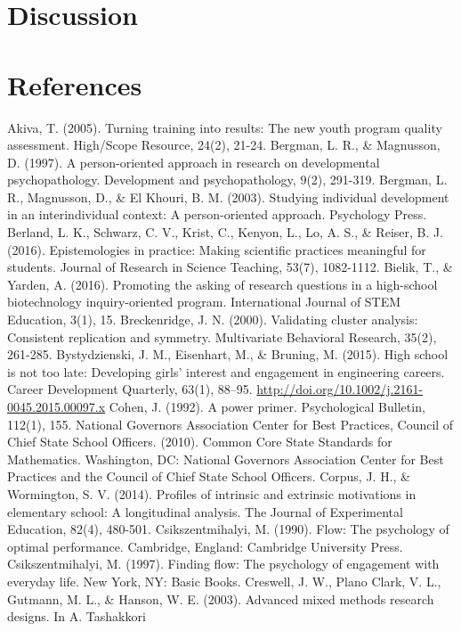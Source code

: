 \documentclass[]{msu-thesis}
\theoremstyle{definition}
\theoremstyle{definition}
\theoremstyle{definition}
\theoremstyle{remark}
\begin{document}
\section{Discussion}\label{discussion}

\section{References}\label{references}

Akiva, T. (2005). Turning training into results: The new youth program
quality assessment. High/Scope Resource, 24(2), 21-24. Bergman, L. R.,
\& Magnusson, D. (1997). A person-oriented approach in research on
developmental psychopathology. Development and psychopathology, 9(2),
291-319. Bergman, L. R., Magnusson, D., \& El Khouri, B. M. (2003).
Studying individual development in an interindividual context: A
person-oriented approach. Psychology Press. Berland, L. K., Schwarz, C.
V., Krist, C., Kenyon, L., Lo, A. S., \& Reiser, B. J. (2016).
Epistemologies in practice: Making scientific practices meaningful for
students. Journal of Research in Science Teaching, 53(7), 1082-1112.
Bielik, T., \& Yarden, A. (2016). Promoting the asking of research
questions in a high-school biotechnology inquiry-oriented program.
International Journal of STEM Education, 3(1), 15. Breckenridge, J. N.
(2000). Validating cluster analysis: Consistent replication and
symmetry. Multivariate Behavioral Research, 35(2), 261-285.
Bystydzienski, J. M., Eisenhart, M., \& Bruning, M. (2015). High school
is not too late: Developing girls' interest and engagement in
engineering careers. Career Development Quarterly, 63(1), 88--95.
\url{http://doi.org/10.1002/j.2161-0045.2015.00097.x} Cohen, J. (1992).
A power primer. Psychological Bulletin, 112(1), 155. National Governors
Association Center for Best Practices, Council of Chief State School
Officers. (2010). Common Core State Standards for Mathematics.
Washington, DC: National Governors Association Center for Best Practices
and the Council of Chief State School Officers. Corpus, J. H., \&
Wormington, S. V. (2014). Profiles of intrinsic and extrinsic
motivations in elementary school: A longitudinal analysis. The Journal
of Experimental Education, 82(4), 480-501. Csikszentmihalyi, M. (1990).
Flow: The psychology of optimal performance. Cambridge, England:
Cambridge University Press. Csikszentmihalyi, M. (1997). Finding flow:
The psychology of engagement with everyday life. New York, NY: Basic
Books. Creswell, J. W., Plano Clark, V. L., Gutmann, M. L., \& Hanson,
W. E. (2003). Advanced mixed methods research designs. In A. Tashakkori
\end{document}
